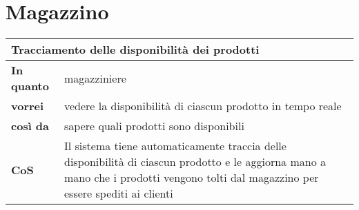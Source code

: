 \section{Magazzino}
\begin{tabularx}{\textwidth}{lX}
  \toprule
  \multicolumn{2}{l}{\textbf{Tracciamento delle disponibilità dei prodotti}} \\
  \midrule
  \textbf{In quanto} & magazziniere \\
  \textbf{vorrei} & vedere la disponibilità di ciascun prodotto in tempo reale \\
  \textbf{così da} & sapere quali prodotti sono disponibili \\
  \midrule
  \textbf{CoS} & Il sistema tiene automaticamente traccia delle disponibilità di ciascun prodotto e le aggiorna mano a mano che i prodotti vengono tolti dal magazzino per essere spediti ai clienti \\
  \bottomrule
\end{tabularx}
